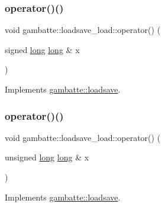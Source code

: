 \subsubsection{\texorpdfstring{operator()()}{operator()()}\hspace{0.1cm}{\footnotesize\ttfamily [8/19]}}
{\footnotesize\ttfamily void gambatte\+::loadsave\+\_\+load\+::operator() (\begin{DoxyParamCaption}\item[{signed \hyperlink{ioapi_8h_a3c7b35ad9dab18b8310343c201f7b27e}{long} \hyperlink{ioapi_8h_a3c7b35ad9dab18b8310343c201f7b27e}{long} \&}]{x }\end{DoxyParamCaption})\hspace{0.3cm}{\ttfamily [virtual]}}



Implements \hyperlink{classgambatte_1_1loadsave_a882deed58830a077498c160ba2870eec}{gambatte\+::loadsave}.

\mbox{\label{classgambatte_1_1loadsave__load_a18686dd69eb8623d5e4d63f45a4ff7ef}} 
\subsubsection{\texorpdfstring{operator()()}{operator()()}\hspace{0.1cm}{\footnotesize\ttfamily [9/19]}}
{\footnotesize\ttfamily void gambatte\+::loadsave\+\_\+load\+::operator() (\begin{DoxyParamCaption}\item[{unsigned \hyperlink{ioapi_8h_a3c7b35ad9dab18b8310343c201f7b27e}{long} \hyperlink{ioapi_8h_a3c7b35ad9dab18b8310343c201f7b27e}{long} \&}]{x }\end{DoxyParamCaption})\hspace{0.3cm}{\ttfamily [virtual]}}



Implements \hyperlink{classgambatte_1_1loadsave_aca5dcc05e845b6aa3086065048ab6e29}{gambatte\+::loadsave}.

\mbox{\label{classgambatte_1_1loadsave__load_a0d08f451690c66586668b1e7c4f87fde}} 
